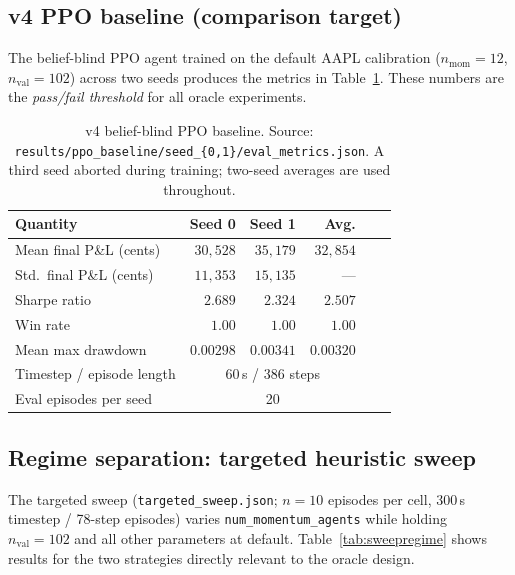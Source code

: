 \documentclass[11pt]{article}
\begin{document}
\subsection{v4 PPO baseline (comparison target)}

The belief-blind PPO agent trained on the default AAPL calibration
($n_\text{mom}=12$, $n_\text{val}=102$) across two seeds produces the
metrics in Table~\ref{tab:v4baseline}.
These numbers are the \emph{pass/fail threshold} for all oracle experiments.

\begin{table}[H]
\centering
\begin{tabular}{lrrrrr}
\toprule
\textbf{Quantity} & \textbf{Seed 0} & \textbf{Seed 1} & \textbf{Avg.} \\
\midrule
Mean final P\&L (cents) & $30{,}528$ & $35{,}179$ & $32{,}854$ \\
Std.\ final P\&L (cents) & $11{,}353$ & $15{,}135$ & --- \\
Sharpe ratio             & $2.689$    & $2.324$    & $2.507$   \\
Win rate                 & $1.00$     & $1.00$     & $1.00$    \\
Mean max drawdown        & $0.00298$  & $0.00341$  & $0.00320$ \\
\midrule
Timestep / episode length & \multicolumn{3}{c}{60\,s / 386 steps} \\
Eval episodes per seed    & \multicolumn{3}{c}{20} \\
\bottomrule
\end{tabular}
\caption{v4 belief-blind PPO baseline. Source:
         \texttt{results/ppo\_baseline/seed\_\{0,1\}/eval\_metrics.json}.
         A third seed aborted during training; two-seed averages are
         used throughout.}
\label{tab:v4baseline}
\end{table}

\subsection{Regime separation: targeted heuristic sweep}

The targeted sweep (\texttt{targeted\_sweep.json}; $n=10$ episodes per cell,
300\,s timestep / 78-step episodes) varies \texttt{num\_momentum\_agents}
while holding $n_\text{val}=102$ and all other parameters at default.
Table~\ref{tab:sweepregime} shows results for the two strategies directly
relevant to the oracle design.
\end{document}
